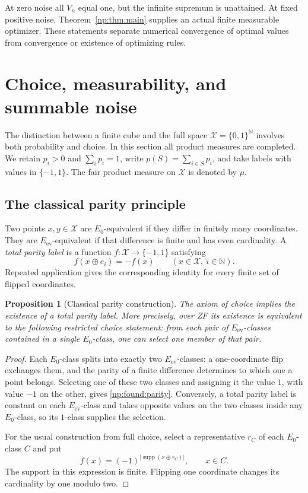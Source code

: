 \documentclass[11pt,a4paper]{article}
\newtheorem{proposition}[theorem]{Proposition}
\theoremstyle{definition}
\theoremstyle{remark}
\newcommand{\N}{\mathbb N}
\newcommand{\cX}{\mathcal X}
\begin{document}
At zero noise all \(V_n\) equal one, but the infinite supremum is
unattained. At fixed positive noise, Theorem~\ref{np:thm:main}
supplies an actual finite measurable optimizer. These statements separate
numerical convergence of optimal values from convergence or existence
of optimizing rules.


\section{Choice, measurability, and summable noise}
\label{np:found:section}

The distinction between a finite cube and the full space
$\cX=\{0,1\}^{\N}$ involves both probability and choice.  In this section all
product measures are completed.  We retain $p_i>0$ and $\sum_i p_i=1$, write
$p(S)=\sum_{i\in S}p_i$, and take labels with values in $\{-1,1\}$.
The fair product measure on $\cX$ is denoted by $\mu$.

\subsection{The classical parity principle}

Two points $x,y\in\cX$ are $E_0$-equivalent if they differ in finitely many
coordinates.  They are $E_{\mathrm{ev}}$-equivalent if that difference is
finite and has even cardinality.  A \emph{total parity label} is a function
$f:\cX\to\{-1,1\}$ satisfying
\begin{equation}
 f(x\oplus e_i)=-f(x)\qquad(x\in\cX,\ i\in\N).
 \label{np:found:parity}
\end{equation}
Repeated application gives the corresponding identity for every finite
set of flipped coordinates.

\begin{proposition}[Classical parity construction]
\label{np:found:choice}
The axiom of choice implies the existence of a total parity label.
More precisely, over ZF its existence is equivalent to the following
restricted choice statement: from each pair of $E_{\mathrm{ev}}$-classes
contained in a single $E_0$-class, one can select one member of that pair.
\end{proposition}

\begin{proof}
Each $E_0$-class splits into exactly two $E_{\mathrm{ev}}$-classes: a
one-coordinate flip exchanges them, and the parity of a finite difference
determines to which one a point belongs.  Selecting one of these two classes
and assigning it the value $1$, with value $-1$ on the other, gives
\eqref{np:found:parity}.  Conversely, a total parity label is constant on
each $E_{\mathrm{ev}}$-class and takes opposite values on the two classes
inside any $E_0$-class, so its $1$-class supplies the selection.

For the usual construction from full choice, select a representative $r_C$
of each $E_0$-class $C$ and put
\[
 f(x)=(-1)^{|\operatorname{supp}(x\oplus r_C)|},\qquad x\in C.
\]
The support in this expression is finite.  Flipping one coordinate changes
its cardinality by one modulo two.
\end{proof}
\end{document}
